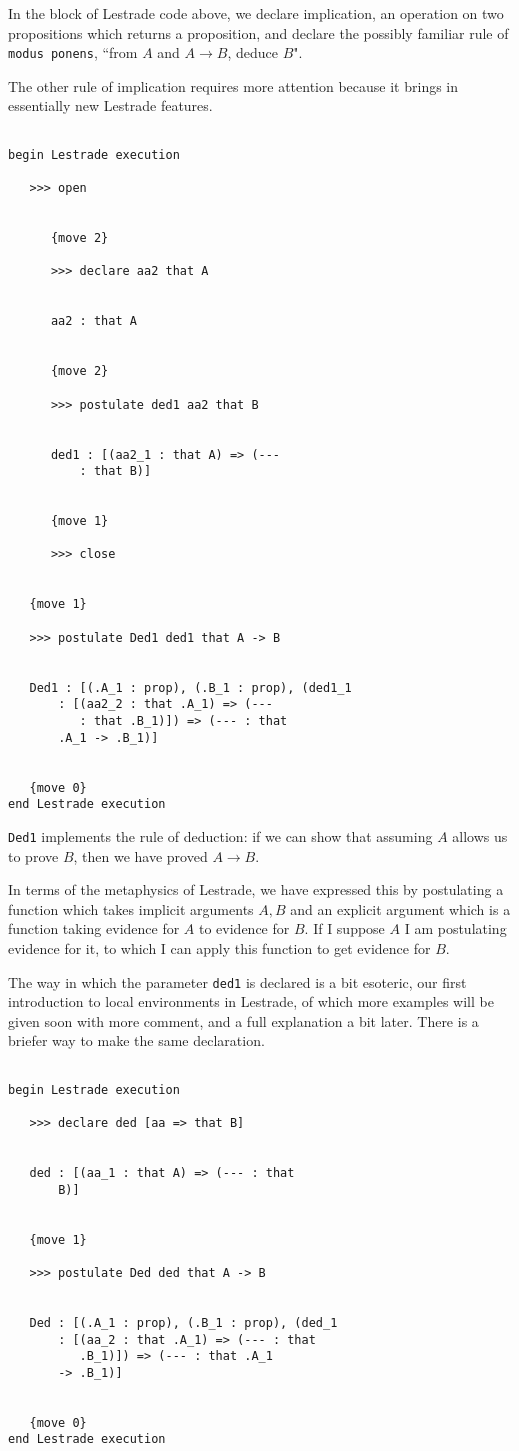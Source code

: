 \documentclass[12pt]{article}
\begin{document}
In the block of Lestrade code above, we declare implication, an operation on two propositions which returns a proposition, and
declare the possibly familiar rule of {\tt modus ponens\/}, ``from $A$ and $A \rightarrow B$, deduce $B$".

The other rule of implication requires more attention because it brings in essentially new Lestrade features.

\begin{verbatim}

begin Lestrade execution

   >>> open


      {move 2}

      >>> declare aa2 that A


      aa2 : that A


      {move 2}

      >>> postulate ded1 aa2 that B


      ded1 : [(aa2_1 : that A) => (--- 
          : that B)]


      {move 1}

      >>> close


   {move 1}

   >>> postulate Ded1 ded1 that A -> B


   Ded1 : [(.A_1 : prop), (.B_1 : prop), (ded1_1 
       : [(aa2_2 : that .A_1) => (--- 
          : that .B_1)]) => (--- : that 
       .A_1 -> .B_1)]


   {move 0}
end Lestrade execution

\end{verbatim}

{\tt Ded1} implements the rule of deduction:  if we can show that assuming $A$ allows us to prove $B$, then we have proved $A \rightarrow B$.

In terms of the metaphysics of Lestrade, we have expressed this by postulating a function which takes implicit arguments $A,B$ and an explicit argument which is a function taking evidence for $A$ to evidence for $B$.  If I suppose $A$ I am postulating evidence for it, to which I can apply this function to get evidence for $B$.

The way in which the parameter {\tt ded1} is declared is a bit esoteric, our first introduction to local environments in Lestrade,  of which more examples will be given soon with more comment, and a full explanation a bit later.  There is a briefer way to make the same declaration.

\begin{verbatim}

begin Lestrade execution

   >>> declare ded [aa => that B]


   ded : [(aa_1 : that A) => (--- : that 
       B)]


   {move 1}

   >>> postulate Ded ded that A -> B


   Ded : [(.A_1 : prop), (.B_1 : prop), (ded_1 
       : [(aa_2 : that .A_1) => (--- : that 
          .B_1)]) => (--- : that .A_1 
       -> .B_1)]


   {move 0}
end Lestrade execution

\end{verbatim}
\end{document}
